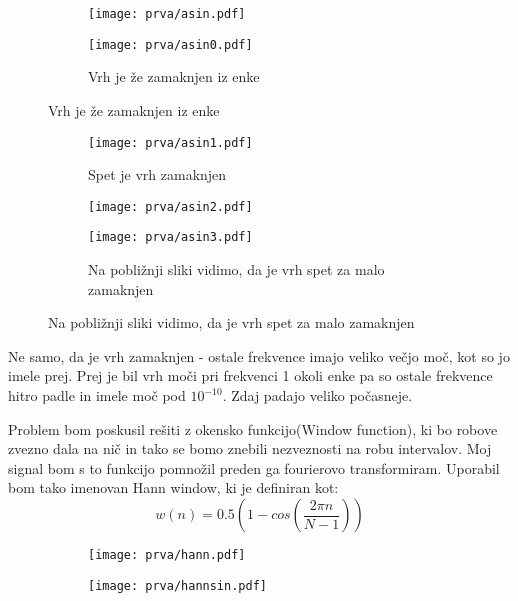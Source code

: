 \documentclass{article}
\begin{document}
\begin{figure}[H]
\begin{subfigure}{.5\textwidth}
\texttt{[image: prva/asin.pdf]}
\end{subfigure}
\begin{subfigure}{.5\textwidth}
\texttt{[image: prva/asin0.pdf]}
\caption*{Vrh je že zamaknjen iz enke}
\end{subfigure}
\end{figure}
\begin{figure}[H]
\begin{subfigure}{.5\textwidth}
\texttt{[image: prva/asin1.pdf]}
\caption*{Spet je vrh zamaknjen}
\end{subfigure}
\begin{subfigure}{.5\textwidth}
\texttt{[image: prva/asin2.pdf]}
\end{subfigure}
\end{figure}
\begin{figure}[H]
\begin{subfigure}{.5\textwidth}
\texttt{[image: prva/asin3.pdf]}
\caption*{Na pobližnji sliki vidimo, da je vrh spet za malo zamaknjen}
\end{subfigure}
\end{figure}

Ne samo, da je vrh zamaknjen - ostale frekvence imajo veliko večjo moč, kot so jo imele prej. Prej je bil vrh moči pri frekvenci 1 okoli enke  pa so ostale frekvence hitro padle in imele moč pod $10^{-10}$. Zdaj padajo veliko počasneje.

Problem bom poskusil rešiti z okensko funkcijo(Window function), ki bo robove zvezno dala na nič in tako se bomo znebili nezveznosti na robu intervalov. Moj signal bom s to funkcijo pomnožil preden ga fourierovo transformiram.
Uporabil bom tako imenovan Hann window, ki je definiran kot:
\begin{equation*}
w(n) = 0.5(1-cos(\frac{2\pi n}{N-1}))
\end{equation*}
\begin{figure}[H]
\begin{subfigure}{.5\textwidth}
\texttt{[image: prva/hann.pdf]}
\end{subfigure}
\begin{subfigure}{.5\textwidth}
\texttt{[image: prva/hannsin.pdf]}
\end{subfigure}
\end{figure}
\end{document}
